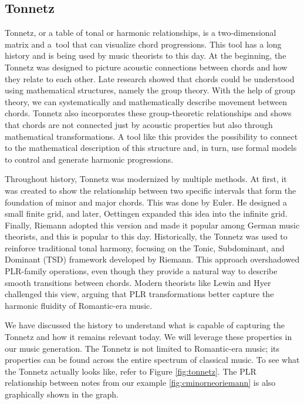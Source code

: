 \subsection*{Tonnetz}
Tonnetz, or a table of tonal or harmonic relationships, is a two-dimensional matrix and a~tool that can visualize chord progressions. This tool has a long history and is being used by music theorists to this day. At the beginning, the Tonnetz was designed to picture acoustic connections between chords and how they relate to each other. Late research showed that chords could be understood using mathematical structures, namely the group theory. With the help of group theory, we can systematically and mathematically describe movement between chords. Tonnetz also incorporates these group-theoretic relationships and shows that chords are not connected just by acoustic properties but also through mathematical transformations. A tool like this provides the possibility to connect to the mathematical description of this structure and, in turn, use formal models to control and generate harmonic progressions.

Throughout history, Tonnetz was modernized by multiple methods. At first, it was created to show the relationship between two specific intervals that form the foundation of minor and major chords. This was done by Euler. He designed a small finite grid, and later, Oettingen expanded this idea into the infinite grid. Finally, Riemann adopted this version and made it popular among German music theorists, and this is popular to this day. Historically, the Tonnetz was used to reinforce traditional tonal harmony, focusing on the Tonic, Subdominant, and Dominant (TSD) framework developed by Riemann. This approach overshadowed PLR-family operations, even though they provide a natural way to describe smooth transitions between chords. Modern theorists like Lewin and Hyer challenged this view, arguing that PLR transformations better capture the harmonic fluidity of Romantic-era music. 

We have discussed the history to understand what is capable of capturing the Tonnetz and how it remains relevant today. We will leverage these properties in our music generation. The Tonnetz is not limited to Romantic-era music; its properties can be found across the entire spectrum of classical music. To see what the Tonnetz actually looks like, refer to Figure \ref{fig:tonnetz}. The PLR relationship between notes from our example \ref{fig:cminorneoriemann} is also graphically shown in the graph.

